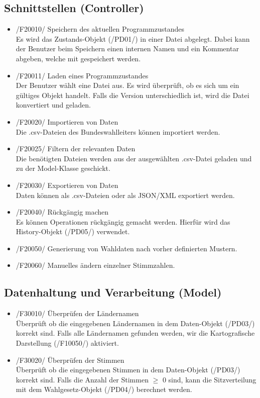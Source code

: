 \documentclass[10pt,a4paper]{article}
\begin{document}
\subsection{Schnittstellen (Controller)}
\begin{itemize}
	\item /F20010/ Speichern des aktuellen Programmzustandes \hfill \\
	Es wird das Zustands-Objekt (/PD01/) in einer Datei abgelegt. Dabei kann der Benutzer beim Speichern einen internen Namen und ein Kommentar abgeben, welche mit gespeichert werden.
	\item /F20011/ Laden eines Programmzustandes \hfill \\
	Der Benutzer wählt eine Datei aus. Es wird überprüft, ob es sich um ein gültiges Objekt handelt. Falls die Version unterschiedlich ist, wird die Datei konvertiert und geladen.
	\item /F20020/ Importieren von Daten \hfill \\
	Die .csv-Dateien des Bundeswahlleiters können importiert werden.
	\item /F20025/ Filtern der relevanten Daten \hfill \\
	Die benötigten Dateien werden aus der ausgewählten .csv-Datei geladen und zu der Model-Klasse geschickt.
	\item /F20030/ Exportieren von Daten \hfill \\
	Daten können als .csv-Dateien oder als JSON/XML exportiert werden.
	\item /F20040/ Rückgängig machen \hfill \\
	Es können Operationen rückgängig gemacht werden. Hierfür wird das History-Objekt (/PD05/) verwendet.
	\item /F20050/ Generierung von Wahldaten nach vorher definierten Mustern.
	\item /F20060/ Manuelles ändern einzelner Stimmzahlen.
\end{itemize}

\subsection{Datenhaltung und Verarbeitung (Model)}
\begin{itemize}
	\item /F30010/ Überprüfen der Ländernamen \hfill \\
	Überprüft ob die eingegebenen Ländernamen in dem Daten-Objekt (/PD03/) korrekt sind. Falls alle Ländernamen gefunden werden, wir die Kartografische Darstellung (/F10050/) aktiviert.
	\item /F30020/ Überprüfen der Stimmen\hfill \\
	Überprüft ob die eingegebenen Stimmen in dem Daten-Objekt (/PD03/) korrekt sind. Falls die Anzahl der Stimmen $\geq$ 0 sind, kann die Sitzverteilung mit dem Wahlgesetz-Objekt (/PD04/) berechnet werden.
\end{itemize}
\end{document}
